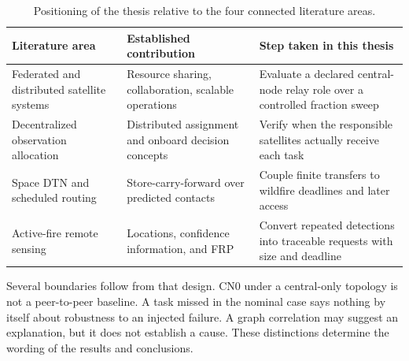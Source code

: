 \begin{table}[htbp]\centering\small
\caption{Positioning of the thesis relative to the four connected literature areas.}
\label{tab:literature_position}
\begin{tabularx}{\textwidth}{XXX}
\toprule
\textbf{Literature area} & \textbf{Established contribution} & \textbf{Step taken in this thesis} \\
\midrule
Federated and distributed satellite systems \citep{Golkar2015,Scrocciolani2024,Messina2025,BenLarbi2021} & Resource sharing, collaboration, scalable operations & Evaluate a declared central-node relay role over a controlled fraction sweep \\
Decentralized observation allocation \citep{Parjan2023,Zilberstein2025} & Distributed assignment and onboard decision concepts & Verify when the responsible satellites actually receive each task \\
Space DTN and scheduled routing \citep{Burleigh2022,Araniti2015,CCSDS2019} & Store-carry-forward over predicted contacts & Couple finite transfers to wildfire deadlines and later access \\
Active-fire remote sensing \citep{Wooster2005,Schroeder2014,WoosterSLSTR2012,XuWooster2023} & Locations, confidence information, and FRP & Convert repeated detections into traceable requests with size and deadline \\
\bottomrule
\end{tabularx}
\end{table}
Several boundaries follow from that design. CN0 under a central-only topology is not a peer-to-peer baseline. A task missed in the nominal case says nothing by itself about robustness to an injected failure. A graph correlation may suggest an explanation, but it does not establish a cause. These distinctions determine the wording of the results and conclusions.
